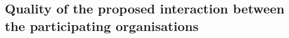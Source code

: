 \documentclass[11pt,a4paper]{article}
\begin{document}
\subsection{Quality of the proposed interaction between the participating organisations}

\label{sec:qualityInteraction}
\processdelayedfloats
%
%
%
%
%
%
%
%
%
%
%
%
\end{document}
